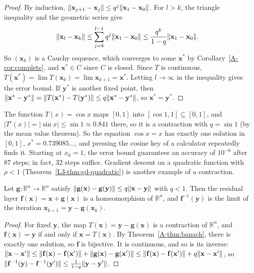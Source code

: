 \begin{proof}
    By induction, $\lVert \mathbf{x}_{j+1} - \mathbf{x}_j \rVert \leq q^j\lVert \mathbf{x}_1 - \mathbf{x}_0 \rVert$. For $l > k$, the triangle inequality and the geometric series give
    \[\lVert \mathbf{x}_l - \mathbf{x}_k \rVert \leq \sum_{j=k}^{l-1} q^j\lVert \mathbf{x}_1 - \mathbf{x}_0 \rVert \leq \frac{q^k}{1 - q}\lVert \mathbf{x}_1 - \mathbf{x}_0 \rVert.\]
    So $(\mathbf{x}_k)$ is a Cauchy sequence, which converges to some $\mathbf{x}^*$ by Corollary~\ref{A-cor:complete}, and $\mathbf{x}^* \in C$ since $C$ is closed. Since $T$ is continuous, $T(\mathbf{x}^*) = \lim T(\mathbf{x}_k) = \lim \mathbf{x}_{k+1} = \mathbf{x}^*$. Letting $l \to \infty$ in the inequality gives the error bound. If $\mathbf{y}^*$ is another fixed point, then $\lVert \mathbf{x}^* - \mathbf{y}^* \rVert = \lVert T(\mathbf{x}^*) - T(\mathbf{y}^*) \rVert \leq q\lVert \mathbf{x}^* - \mathbf{y}^* \rVert$, so $\mathbf{x}^* = \mathbf{y}^*$.
\end{proof}

\begin{example}\label{A-ex:dottie}
    The function $T(x) = \cos x$ maps $[0, 1]$ into $[\cos 1, 1] \subseteq [0, 1]$, and $|T'(x)| = |\sin x| \leq \sin 1 \approx 0.841$ there, so it is a contraction with $q = \sin 1$ (by the mean value theorem). So the equation $\cos x = x$ has exactly one solution in $[0, 1]$, $x^* = 0.739085\ldots$, and pressing the cosine key of a calculator repeatedly finds it. Starting at $x_0 = 1$, the error bound guarantees an accuracy of $10^{-6}$ after $87$ steps; in fact, $32$ steps suffice. Gradient descent on a quadratic function with $\rho < 1$ (Theorem~\ref{L3-thm:gd-quadratic}) is another example of a contraction.
\end{example}

\begin{corollary}\label{A-cor:residual}
    Let $\mathbf{g}: \mathbb{R}^n \to \mathbb{R}^n$ satisfy $\lVert \mathbf{g}(\mathbf{x}) - \mathbf{g}(\mathbf{y}) \rVert \leq q\lVert \mathbf{x} - \mathbf{y} \rVert$ with $q < 1$. Then the residual layer $\mathbf{f}(\mathbf{x}) = \mathbf{x} + \mathbf{g}(\mathbf{x})$ is a homeomorphism of $\mathbb{R}^n$, and $\mathbf{f}^{-1}(\mathbf{y})$ is the limit of the iteration $\mathbf{x}_{k+1} = \mathbf{y} - \mathbf{g}(\mathbf{x}_k)$.
\end{corollary}

\begin{proof}
    For fixed $\mathbf{y}$, the map $T(\mathbf{x}) = \mathbf{y} - \mathbf{g}(\mathbf{x})$ is a contraction of $\mathbb{R}^n$, and $\mathbf{f}(\mathbf{x}) = \mathbf{y}$ if and only if $\mathbf{x} = T(\mathbf{x})$. By Theorem~\ref{A-thm:banach}, there is exactly one solution, so $\mathbf{f}$ is bijective. It is continuous, and so is its inverse: $\lVert \mathbf{x} - \mathbf{x}' \rVert \leq \lVert \mathbf{f}(\mathbf{x}) - \mathbf{f}(\mathbf{x}') \rVert + \lVert \mathbf{g}(\mathbf{x}) - \mathbf{g}(\mathbf{x}') \rVert \leq \lVert \mathbf{f}(\mathbf{x}) - \mathbf{f}(\mathbf{x}') \rVert + q\lVert \mathbf{x} - \mathbf{x}' \rVert$, so $\lVert \mathbf{f}^{-1}(\mathbf{y}) - \mathbf{f}^{-1}(\mathbf{y}') \rVert \leq \frac{1}{1 - q}\lVert \mathbf{y} - \mathbf{y}' \rVert$.
\end{proof}

